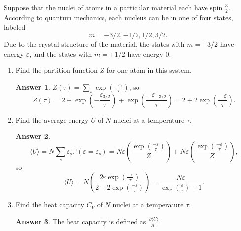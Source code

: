 \documentclass[12pt]{article}
\newenvironment{problem}[2][Problem]{\begin{trivlist}
    \item[\hskip \labelsep {\bfseries #1}\hskip \labelsep {\bfseries #2.}]}{\end{trivlist}}
\theoremstyle{definition}
\newtheorem*{answer}{Answer}
\begin{document}
\begin{problem}{3}
  Suppose that the nuclei of atoms in a particular material each have spin \( \frac{3}{2} \).
  According to quantum mechanics, each nucleus can be in one of four states, labeled
  \begin{equation}
  \label{eq:9}
  m = -3/2, -1/2, 1/2, 3/2.
  \end{equation}
  Due to the crystal structure of the material, the states with \( m = \pm 3/2 \) have energy \( \varepsilon \), and the states with \( m = \pm 1/2 \) have energy \( 0 \).

  \begin{enumerate}[label=(\alph*)]
          \item Find the partition function \( Z \) for one atom in this system.
          \begin{answer}
            \( Z(\tau) = \sum\limits_s \exp( \frac{-\varepsilon_{s}}{\tau} ) \), so
            \begin{equation}
            \label{eq:10}
            Z(\tau) = 2 + \exp( -\frac{\varepsilon_{3/2}}{\tau} ) + \exp( \frac{-\varepsilon_{-3/2}}{\tau} ) = \boxed{2 + 2\exp( \frac{-\varepsilon}{\tau} )}.
            \end{equation}
          \end{answer}
          \item Find the average energy \( U \) of \( N \) nuclei at a temperature \(\tau\).
          \begin{answer}
            \begin{equation}
            \label{eq:11}
            \langle U \rangle = N \sum\limits_s \varepsilon_s \mathbb{P}(\varepsilon = \varepsilon_s) = N \varepsilon (\frac{\exp(\frac{-\varepsilon}{\tau})}{Z}) +N \varepsilon (\frac{\exp(\frac{-\varepsilon}{\tau})}{Z}),
            \end{equation}
            so
            \begin{equation}
            \label{eq:13}
            \langle U \rangle = N \left( \frac{2\varepsilon\exp(\frac{-\varepsilon}{\tau})}{2 + 2\exp(\frac{-\varepsilon}{\tau})} \right) = \boxed{\frac{N\varepsilon}{\exp(\frac{\varepsilon}{\tau}) + 1}}.
            \end{equation}

          \end{answer}
    \item Find the heat capacity \( C_V \) of \( N \) nuclei at a temperature \( \tau \).
          \begin{answer}
            The heat capacity is defined as \( \frac{\partial \langle U \rangle}{\partial \tau}  \).


\end{answer}
\end{enumerate}
\end{problem}
\end{document}
